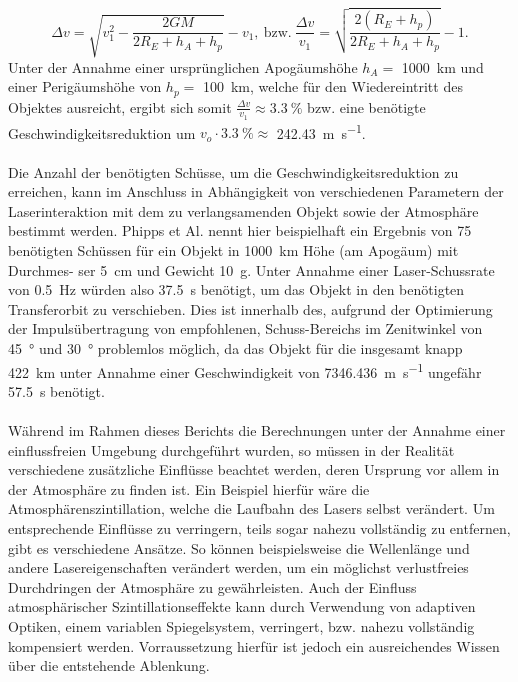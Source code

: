 \documentclass{article}
\begin{document}
\begin{equation}
	\label{deltaspeed}
	\Delta v = \sqrt{v_1^2-\frac{2GM}{2R_E+h_A+h_p}}-v_1,\mathrm{\ bzw.\ } \frac{\Delta v}{v_1} = \sqrt{\frac{2(R_E+h_p)}{2R_E+h_A+h_p}}-1.
\end{equation}
\noindent
Unter der Annahme einer ursprünglichen Apogäumshöhe $h_A=$ \SI{1000}{\kilo\meter} und einer Perigäumshöhe von $h_p=$ \SI{100}{\kilo \meter}, welche für den Wiedereintritt des Objektes ausreicht, ergibt sich somit $\frac{\Delta v}{v_1} \approx \SI{3.3}{\percent}$ bzw. eine benötigte Geschwindigkeitsreduktion um $v_o\cdot \SI{3.3}{\percent}\approx$ \SI{242.43}{\meter \per\second}.
\\\\
Die Anzahl der benötigten Schüsse, um die Geschwindigkeitsreduktion zu erreichen, kann im Anschluss in Abhängigkeit von verschiedenen Parametern der Laserinteraktion mit dem zu verlangsamenden Objekt sowie der Atmosphäre bestimmt werden. Phipps et Al.\cite{p11q3orion} nennt hier beispielhaft ein Ergebnis von 75 benötigten Schüssen für ein Objekt in \SI{1000}{\kilo\meter} Höhe (am Apogäum) mit Durchmes- ser \SI{5}{\centi\meter} und Gewicht \SI{10}{\gram}. Unter Annahme einer Laser-Schussrate von \SI{0.5}{\hertz} würden also \SI{37.5}{\second} benötigt, um das Objekt in den benötigten Transferorbit zu verschieben. Dies ist innerhalb des, aufgrund der Optimierung der Impulsübertragung von \citet{phipps11} empfohlenen, Schuss-Bereichs im Zenitwinkel von \SI{45}{\degree} und \SI{30}{\degree} problemlos möglich, da das Objekt für die insgesamt knapp \SI{422}{\kilo\meter} unter Annahme einer Geschwindigkeit von \SI{7346.436}{\meter \per \second} ungefähr \SI{57.5}{\second} benötigt.\\\\
Während im Rahmen dieses Berichts die Berechnungen unter der Annahme einer einflussfreien Umgebung durchgeführt wurden, so müssen in der Realität verschiedene zusätzliche Einflüsse beachtet werden, deren Ursprung vor allem in der Atmosphäre zu finden ist. Ein Beispiel hierfür wäre die Atmosphärenszintillation, welche die Laufbahn des Lasers selbst verändert. Um entsprechende Einflüsse zu verringern, teils sogar nahezu vollständig zu entfernen, gibt es verschiedene Ansätze. So können beispielsweise die Wellenlänge und andere Lasereigenschaften verändert werden, um ein möglichst verlustfreies Durchdringen der Atmosphäre zu gewährleisten. Auch der Einfluss atmosphärischer Szintillationseffekte kann durch Verwendung von adaptiven Optiken, einem variablen Spiegelsystem, verringert, bzw. nahezu vollständig kompensiert werden. Vorraussetzung hierfür ist jedoch ein ausreichendes Wissen über die entstehende Ablenkung.
\end{document}
